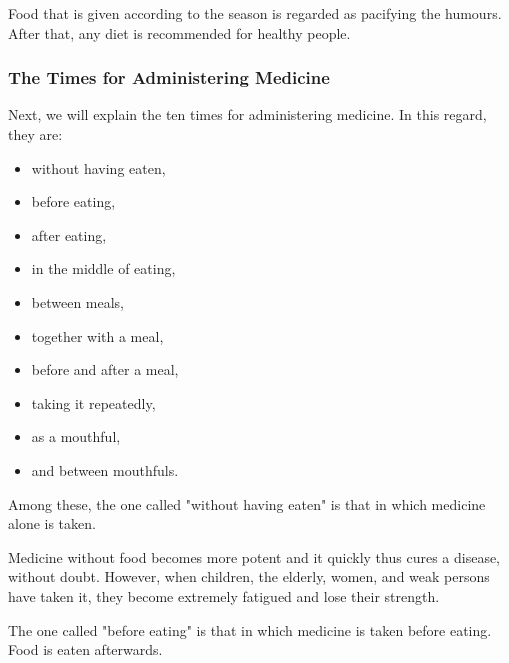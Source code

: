 \begin{translation}
	\item[84] %
	Food that is given according to the season is regarded as pacifying the humours. %
	After that, any diet is recommended for healthy people.

	\subsubsection{The Times for Administering Medicine}

	\item[85] %
	Next, we will explain the ten times for administering medicine. In this regard, they are:
	\begin{itemize}
		\item without having eaten,
		\item before eating,
		\item after eating,
		\item in the middle of eating,
		\item between meals,
		\item together with a meal,
		\item before and after a meal, %
		\item taking it repeatedly, %
		\item as a mouthful, %
		\item and between mouthfuls. %
	\end{itemize}

	\item[86]
	Among these, %
	the one called "without having eaten" is that in which %
	medicine alone is taken.

	\item[87]
	Medicine without food becomes more potent and it quickly thus cures a disease, without doubt. %
	However, when children, the elderly, women, and weak persons have taken it, %
	they become extremely fatigued and lose their strength.

	\item[88]
	The one called "before eating" is that in which medicine is taken before eating. %
	Food is eaten afterwards. %


\end{translation}
